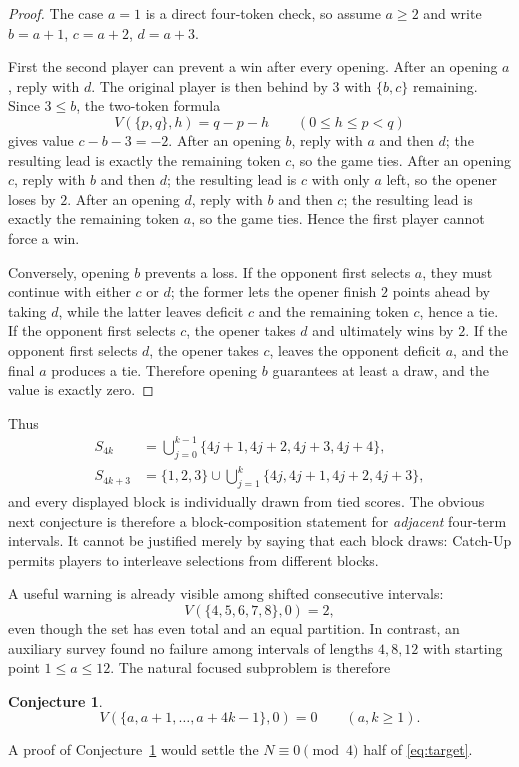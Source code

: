 \documentclass[11pt]{article}
\newtheorem{conjecture}[theorem]{Conjecture}
\theoremstyle{remark}
\begin{document}
\begin{proof}
The case $a=1$ is a direct four-token check, so assume $a\ge2$ and write
$b=a+1$, $c=a+2$, $d=a+3$.

First the second player can prevent a win after every opening.  After an
opening $a$, reply with $d$.  The original player is then behind by $3$ with
$\{b,c\}$ remaining.  Since $3\le b$, the two-token formula
\[
V(\{p,q\},h)=q-p-h\qquad(0\le h\le p<q)
\]
gives value $c-b-3=-2$.  After an opening $b$, reply with $a$ and then $d$;
the resulting lead is exactly the remaining token $c$, so the game ties.
After an opening $c$, reply with $b$ and then $d$; the resulting lead is $c$
with only $a$ left, so the opener loses by $2$.  After an opening $d$, reply
with $b$ and then $c$; the resulting lead is exactly the remaining token $a$,
so the game ties.  Hence the first player cannot force a win.

Conversely, opening $b$ prevents a loss.  If the opponent first selects $a$,
they must continue with either $c$ or $d$; the former lets the opener finish
$2$ points ahead by taking $d$, while the latter leaves deficit $c$ and the
remaining token $c$, hence a tie.  If the opponent first selects $c$, the
opener takes $d$ and ultimately wins by $2$.  If the opponent first selects
$d$, the opener takes $c$, leaves the opponent deficit $a$, and the final
$a$ produces a tie.  Therefore opening $b$ guarantees at least a draw, and
the value is exactly zero.
\end{proof}

Thus
\begin{align*}
S_{4k}&=\bigcup_{j=0}^{k-1}\{4j+1,4j+2,4j+3,4j+4\},\\
S_{4k+3}&=\{1,2,3\}\cup
\bigcup_{j=1}^{k}\{4j,4j+1,4j+2,4j+3\},
\end{align*}
and every displayed block is individually drawn from tied scores.  The
obvious next conjecture is therefore a block-composition statement for
\emph{adjacent} four-term intervals.  It cannot be justified merely by saying
that each block draws: Catch-Up permits players to interleave selections from
different blocks.

A useful warning is already visible among shifted consecutive intervals:
\[
V(\{4,5,6,7,8\},0)=2,
\]
even though the set has even total and an equal partition.  In contrast, an
auxiliary survey found no failure among intervals of lengths $4,8,12$ with
starting point $1\le a\le12$.  The natural focused subproblem is therefore
\begin{conjecture}\label{conj:interval4k}
\[
V(\{a,a+1,\ldots,a+4k-1\},0)=0\qquad(a,k\ge1).
\]
\end{conjecture}
A proof of Conjecture~\ref{conj:interval4k} would settle the
$N\equiv0\pmod4$ half of \eqref{eq:target}.
\end{document}
